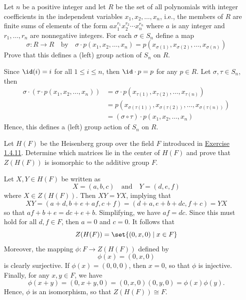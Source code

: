 \begin{exercise} \label{ex2.2.13}
    Let $n$ be a positive integer and let $R$ be the set of all polynomials with integer coefficients in the independent variables $x_1, x_2, \ldots, x_n$, i.e., the members of $R$ are finite sums of elements of the form $ax_1^{r_1}x_2^{r_2} \cdots x_n^{r_n}$ where $a$ is any integer and $r_1, \ldots, r_n$ are nonnegative integers. For each $\sigma \in S_n$ define a map
    \[\sigma : R \to R \quad \text{by} \quad \sigma \cdot p(x_1, x_2, \ldots, x_n) = p(x_{\sigma(1)}, x_{\sigma(2)}, \ldots, x_{\sigma(n)})\]
    Prove that this defines a (left) group action of $S_n$ on $R$.
\end{exercise}

\begin{sol}
    Since $\id(i) = i$ for all $1 \leq i \leq n$, then $\id \cdot p = p$ for any $p \in R$. Let $\sigma, \tau \in S_n$, then
    \begin{align*}
        \sigma \cdot (\tau \cdot p(x_1, x_2, \ldots, x_n)) & = \sigma \cdot p(x_{\tau(1)}, x_{\tau(2)}, \ldots, x_{\tau(n)}) \\
        & = p(x_{\sigma(\tau(1))}, x_{\sigma(\tau(2))}, \ldots, x_{\sigma(\tau(n))}) \\
        & = (\sigma \circ \tau) \cdot p(x_1, x_2, \ldots, x_n)
    \end{align*}
    Hence, this defines a (left) group action of $S_n$ on $R$.
\end{sol}

\begin{exercise} \label{ex2.2.14}
    Let $H(F)$ be the Heisenberg group over the field $F$ introduced in \hyperref[ex1.4.11]{Exercise 1.4.11}. Determine which matrices lie in the center of $H(F)$ and prove that $Z(H(F))$ is isomorphic to the additive group $F$.
\end{exercise}

\begin{sol}
    Let $X, Y \in H(F)$ be written as
    \[X = (a, b, c) \quad \text{and} \quad Y = (d, e, f)\]
    where $X \in Z(H(F))$. Then $XY = YX$, implying that
    \[XY = (a + d, b + e + af, c + f) = (d + a, e + b + dc, f + c) = YX\]
    so that $af + b + e = dc + e + b$. Simplifying, we have $af = dc$. Since this must hold for all $d, f \in F$, then $a = 0$ and $c = 0$. It follows that
    \[Z(H(F)) = \set{(0, x, 0) \mid x \in F}\]
    Moreover, the mapping $\phi : F \to Z(H(F))$ defined by
    \[\phi(x) = (0, x, 0)\]
    is clearly surjective. If $\phi(x) = (0, 0, 0)$, then $x = 0$, so that $\phi$ is injective. Finally, for any $x, y \in F$, we have
    \[\phi(x + y) = (0, x + y, 0) = (0, x, 0)(0, y, 0) = \phi(x) \phi(y).\]
    Hence, $\phi$ is an isomorphism, so that $Z(H(F)) \cong F$.
\end{sol}

